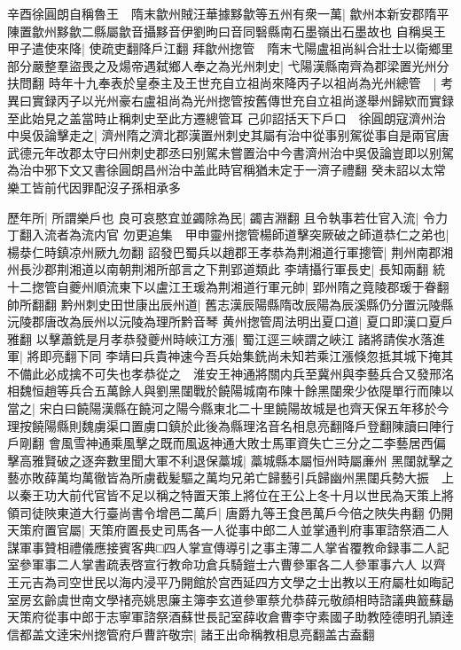 辛酉徐圓朗自稱魯王　隋末歙州賊汪華據黟歙等五州有衆一萬|{
	歙州本新安郡隋平陳置歙州黟歙二縣屬歙音攝黟音伊劉昫曰音同䃜縣南石墨嶺出石墨故也}
自稱吳王甲子遣使來降|{
	使疏吏翻降戶江翻}
拜歙州揔管　隋末弋陽盧祖尚糾合壯士以衛鄉里部分嚴整羣盜畏之及煬帝遇弑鄉人奉之為光州刺史|{
	弋陽漢縣南齊為郡梁置光州分扶問翻}
時年十九奉表於皇泰主及王世充自立祖尚來降丙子以祖尚為光州總管　|{
	考異曰實録丙子以光州豪右盧祖尚為光州揔管按舊傳世充自立祖尚遂舉州歸欵而實録至此始見之盖當時止稱刺史至此方遷總管耳}
己卯詔括天下戶口　徐圓朗寇濟州治中吳伋論擊走之|{
	濟州隋之濟北郡漢置州刺史其屬有治中從事别駕從事自是兩官唐武德元年改郡太守曰州刺史郡丞曰别駕未嘗置治中今書濟州治中吳伋論豈即以别駕為治中邪下文又書徐圓朗昌州治中盖此時官稱猶未定于一濟子禮翻}
癸未詔以太常樂工皆前代因罪配沒子孫相承多

歷年所|{
	所謂樂戶也}
良可哀愍宜並蠲除為民|{
	蠲吉淵翻}
且令執事若仕官入流|{
	令力丁翻入流者為流内官}
勿更追集　甲申靈州揔管楊師道擊突厥破之師道恭仁之弟也|{
	楊㳟仁時鎮凉州厥九勿翻}
詔發巴蜀兵以趙郡王孝恭為荆湘道行軍摠管|{
	荆州南郡湘州長沙郡荆湘道以南朝荆湘所部言之下荆郢道類此}
李靖攝行軍長史|{
	長知兩翻}
統十二揔管自夔州順流東下以盧江王瑗為荆湘道行軍元帥|{
	郢州隋之竟陵郡瑗于眷翻帥所翻翻}
黔州刺史田世康出辰州道|{
	舊志漢辰陽縣隋改辰陽為辰溪縣仍分置沅陵縣沅陵郡唐改為辰州以沅陵為理所黔音琴}
黄州揔管周法明出夏口道|{
	夏口即漢口夏戶雅翻}
以擊蕭銑是月孝恭發夔州時峽江方漲|{
	蜀江逕三峽謂之峽江}
諸將請俟水落進軍|{
	將即亮翻下同}
李靖曰兵貴神速今吾兵始集銑尚未知若乘江漲倏忽抵其城下掩其不備此必成擒不可失也孝恭從之　淮安王神通將關内兵至冀州與李藝兵合又發邢洺相魏恒趙等兵合五萬餘人與劉黑闥戰於饒陽城南布陳十餘黑闥衆少依隄單行而陳以當之|{
	宋白曰饒陽漢縣在饒河之陽今縣東北二十里饒陽故城是也齊天保五年移於今理按饒陽縣則魏虜渠口置虜口鎮於此後為縣理洺音名相息亮翻降戶登翻陳讀曰陣行戶剛翻}
會風雪神通乘風擊之既而風返神通大敗士馬軍資失亡三分之二李藝居西偏擊高雅賢破之逐奔數里聞大軍不利退保藁城|{
	藁城縣本屬恒州時屬亷州}
黑闥就擊之藝亦敗薛萬均萬徹皆為所虜截髪驅之萬均兄弟亡歸藝引兵歸幽州黑闥兵勢大振　上以秦王功大前代官皆不足以稱之特置天策上將位在王公上冬十月以世民為天策上將領司徒陜東道大行臺尚書令增邑二萬戶|{
	唐爵九等王食邑萬戶今倍之陜失冉翻}
仍開天策府置官屬|{
	天策府置長史司馬各一人從事中郎二人並掌通判府事軍諮祭酒二人謀軍事贊相禮儀應接賓客典□四人掌宣傳導引之事主薄二人掌省覆教命録事二人記室參軍事二人掌書疏表啓宣行教命功倉兵騎鎧士六曹參軍各二人參軍事六人}
以齊王元吉為司空世民以海内浸平乃開館於宫西延四方文學之士出教以王府屬杜如晦記室房玄齡虞世南文學禇亮姚思廉主簿李玄道參軍蔡允恭薛元敬顔相時諮議典籖蘇朂天策府從事中郎于志寧軍諮祭酒蘇世長記室薛收倉曹李守素國子助教陸德明孔頴逹信都盖文逹宋州揔管府戶曹許敬宗|{
	諸王出命稱教相息亮翻盖古盍翻}
